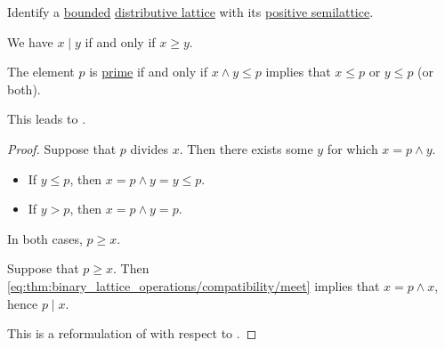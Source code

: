 \begin{proposition}\label{thm:lattice_divisibility}
  Identify a \hyperref[def:semilattice/bounded]{bounded} \hyperref[def:semilattice/distributive_lattice]{distributive lattice} with its \hyperref[ex:def:semiring/lattice]{positive semilattice}.

  \begin{thmenum}
     We have \( x \mid y \) if and only if \( x \geq y \).

     The element \( p \) is \hyperref[def:domain_divisibility/prime]{prime} if and only if \( x \wedge y \leq p \) implies that \( x \leq p \) or \( y \leq p \) (or both).
  \end{thmenum}
\end{proposition}
\begin{comments}
  \item This leads to .
\end{comments}
\begin{proof}
  \SufficiencySubProof* Suppose that \( p \) divides \( x \). Then there exists some \( y \) for which \( x = p \wedge y \).
  \begin{itemize}
    \item If \( y \leq p \), then \( x = p \wedge y = y \leq p \).
    \item If \( y > p \), then \( x = p \wedge y = p \).
  \end{itemize}

  In both cases, \( p \geq x \).

  \NecessitySubProof* Suppose that \( p \geq x \). Then \eqref{eq:thm:binary_lattice_operations/compatibility/meet} implies that \( x = p \wedge x \), hence \( p \mid x \).

   This is a reformulation of  with respect to .
\end{proof}

